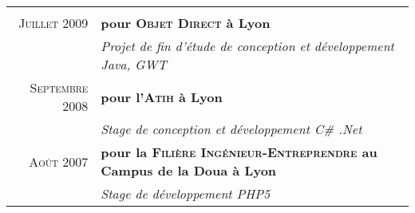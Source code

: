 \documentclass[a4paper,10pt]{article}
\begin{document}
\begin{supertabular}{r|p{11cm}}

     \\

    \textsc{Juillet} 2009 & \textbf{pour \textsc{Objet Direct} à Lyon} \\
      & \emph{Projet de fin d'étude de conception et développement Java, GWT} \\
    \footnotesize{\textsc{Septembre} 2008} & \textbf{pour l’\textsc{Atih} à Lyon} \\
      & \emph{Stage de conception et développement C\# .Net} \\
    \footnotesize{\textsc{Août} 2007} & \textbf{pour la \textsc{Filière Ingénieur-Entreprendre} au Campus de la Doua à Lyon} \\
      & \emph{Stage de développement PHP5} \\
  \end{supertabular} \\
\end{document}
